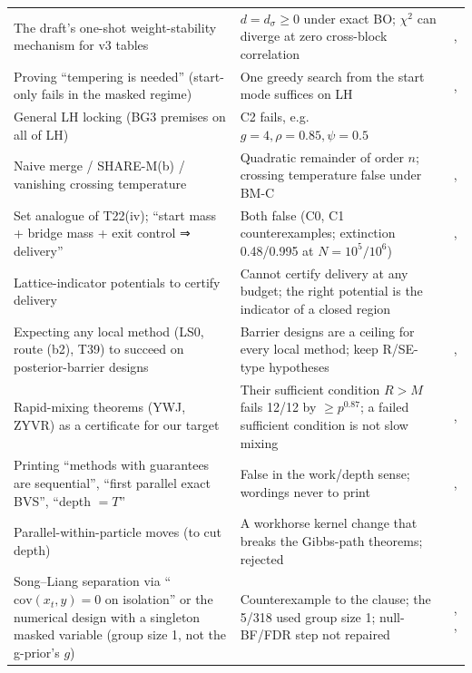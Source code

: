 {\begin{xltabular}{\textwidth}{@{}>{\raggedright\arraybackslash}p{4.2cm}>{\raggedright\arraybackslash}X >{\raggedright\arraybackslash}p{3.3cm}@{}}
The draft's one-shot weight-stability mechanism for v3 tables & $d=d_\sigma\ge0$ under exact BO; $\chi^2$ can diverge at zero cross-block correlation & ,   \\
Proving ``tempering is needed'' (start-only fails in the masked regime) & One greedy search from the start mode suffices on LH & ,   \\
General LH locking (BG3 premises on all of LH) & C2 fails, e.g. $g=4,\rho=0.85,\psi=0.5$ &   \\
Naive merge / SHARE-M(b) / vanishing crossing temperature & Quadratic remainder of order $n$; crossing temperature false under BM-C & ,   \\
Set analogue of T22(iv); ``start mass + bridge mass + exit control ⇒ delivery'' & Both false (C0, C1 counterexamples; extinction 0.48/0.995 at $N=10^5/10^6$) & ,   \\
Lattice-indicator potentials to certify delivery & Cannot certify delivery at any budget; the right potential is the indicator of a closed region &   \\
Expecting any local method (LS0, route (b2), T39) to succeed on posterior-barrier designs & Barrier designs are a ceiling for every local method; keep R/SE-type hypotheses & ,   \\
Rapid-mixing theorems (YWJ, ZYVR) as a certificate for our target & Their sufficient condition $R>M$ fails 12/12 by $\ge p^{0.87}$; a failed sufficient condition is not slow mixing & ,   \\
Printing ``methods with guarantees are sequential'', ``first parallel exact BVS'', ``depth $=T$'' & False in the work/depth sense; wordings never to print & ,   \\
Parallel-within-particle moves (to cut depth) & A workhorse kernel change that breaks the Gibbs-path theorems; rejected &   \\
Song--Liang separation via ``$\mathrm{cov}(x_t,y)=0$ on isolation'' or the numerical design with a singleton masked variable (group size 1, not the g-prior's $g$) & Counterexample to the clause; the 5/318 used group size 1; null-BF/FDR step not repaired & , ,   \\

\end{xltabular}}
